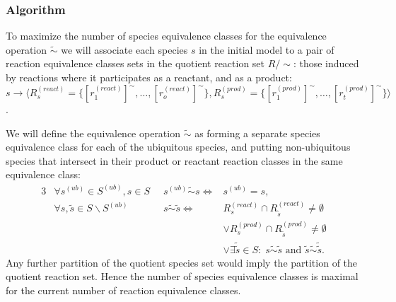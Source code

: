 \documentclass[10pt]{bmc_article}
\newenvironment{bmcformat}{\baselineskip20pt\sloppy\setboolean{publ}{false}}{\baselineskip20pt\sloppy}
\begin{document}
\begin{bmcformat}
\subsubsection*{Algorithm}
To maximize the number of species equivalence classes for the equivalence operation $\tilde{\sim}$ we will associate each species $s$ in the initial model to a pair of reaction equivalence classes sets in the quotient reaction set $R/{\sim}$: those induced by reactions where it participates as a reactant, and as a product: $s \rightarrow \langle R^{(react)}_s = \{[r^{(react)}_1]^{\sim}, \ldots, [r^{(react)}_o]^{\sim}\}, R^{(prod)}_s = \{[r^{(prod)}_1]^{\sim}, \ldots, [r^{(prod)}_t]^{\sim}\}\rangle$.

We will define the equivalence operation $\tilde{\sim}$ as forming a separate species equivalence class for each of the ubiquitous species, and putting non-ubiquitous species that intersect in their product or reactant reaction classes in the same equivalence class:
\begin{alignat*}{3}
& \forall s^{(ub)} \in S^{(ub)}, s \in S \;\; & s^{(ub)} \tilde{\sim} s \iff & s^{(ub)} = s, \\
& \forall s, \tilde{s} \in S \backslash S^{(ub)} \; & s \tilde{\sim} \tilde{s} \iff 
& R^{(react)}_s \cap R^{(react)}_{\tilde{s}} \neq \emptyset \\
& ~ & ~ &\lor R^{(prod)}_s \cap R^{(prod)}_{\tilde{s}} \neq \emptyset \\
& ~ & ~ &\lor \exists \tilde{\tilde{s}} \in S:\; s \tilde{\sim} \tilde{s} \text{ and } \tilde{s} \tilde{\sim} \tilde{\tilde{s}}. 
\end{alignat*}
Any further partition of the quotient species set would imply the partition of the quotient reaction set. Hence the number of species equivalence classes is maximal for the current number of reaction equivalence classes. \\


\end{bmcformat}
\end{document}
